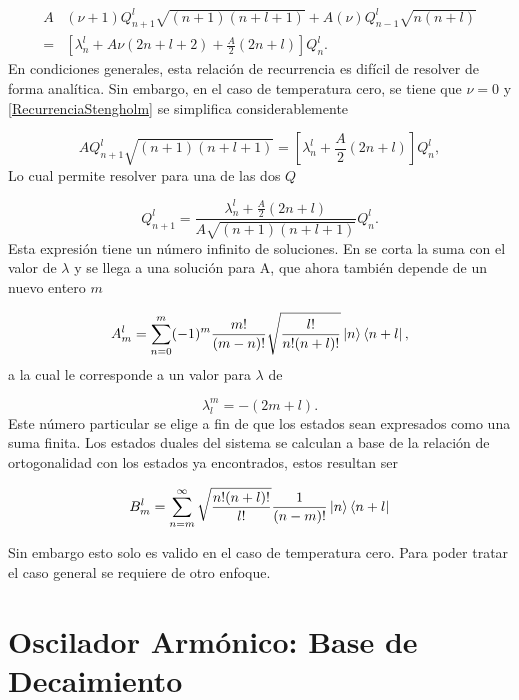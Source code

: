 \documentclass[a4paper,10pt]{report}
\begin{document}
\begin{align}\label{RecurrenciaStengholm}
A&(\nu+1) Q_{n+1}^l \sqrt{(n+1)(n+l+1) }+ A(\nu) Q_{n-1}^l\sqrt{n(n+l)}\\ \nonumber
=&[\lambda_n^l+A\nu(2n+l+2)+\frac{A}{2}(2n+l)]Q_{n}^l.
\end{align}  En condiciones generales, esta relación de recurrencia es difícil de resolver de forma analítica. Sin embargo, en el caso de temperatura cero, se tiene que $\nu = 0$ y \eqref{RecurrenciaStengholm} se simplifica considerablemente

\begin{equation}
AQ_{n+1}^l\sqrt{(n+1)(n+l+1)}=[\lambda_n^l + \frac{A}{2}(2n+l)]Q_n^l,
\end{equation} Lo cual permite resolver para una de las dos $Q$

\begin{equation}
Q_{n+1}^l = \frac{\lambda_n^l + \frac{A}{2}(2n+l)}{A\sqrt{(n+1)(n+l+1)}}Q_n^l.
\end{equation}Esta expresión tiene un número infinito de soluciones. En \cite{BarnettSD} se corta la suma con el valor de $\lambda$ y se llega a una solución para A, que ahora también depende de un nuevo entero $m$

\begin{equation}
A_m^l = \sum_{n=0}^m (-1)^m \frac{m!}{(m-n)!}\sqrt{\frac{l!}{n!(n+l)!}}\Ket{n}\Bra{n+l},
\end{equation} a la cual le corresponde a un valor para $\lambda$ de

\begin{equation}
\lambda_l^m = -(2m+l).
\end{equation}Este número particular se elige a fin de que los estados sean expresados como una suma finita. Los estados duales del sistema se calculan a base de la relación de ortogonalidad con los estados ya encontrados, estos resultan ser \cite{BarnettSD}

\begin{equation}
B_m^l = \sum_{n=m}^\infty \sqrt{\frac{n!(n+l)!}{l!}}\frac{1}{(n-m)!}\Ket{n}\Bra{n+l}
\end{equation}

Sin embargo esto solo es valido en el caso de temperatura cero. Para poder tratar el caso general se requiere de otro enfoque.

\section{Oscilador Armónico: Base de Decaimiento}
\end{document}
